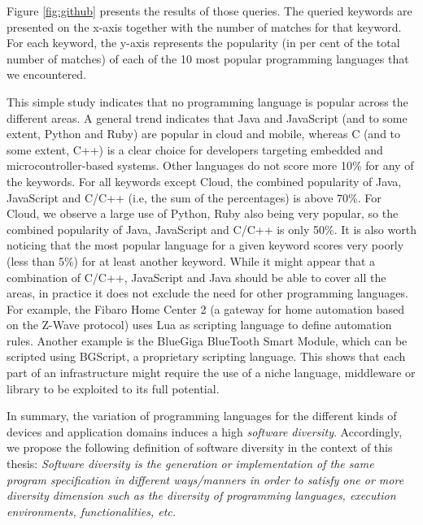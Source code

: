 Figure \ref{fig:github} presents the results of those queries. The queried keywords are presented on the x-axis together with the number of matches for that keyword. For each keyword, the y-axis represents the popularity (in per cent of the total number of matches) of each of the 10 most popular programming languages that we encountered.


This simple study indicates that no programming language is popular across the different areas. A general trend indicates that Java and JavaScript (and to some extent, Python and Ruby) are popular in cloud and mobile, whereas C (and to some extent, C++) is a clear choice for developers targeting embedded and microcontroller-based systems. Other languages do not score more 10\% for any of the keywords. 
For all keywords except Cloud, the combined popularity of Java, JavaScript and C/C++ (i.e, the sum
of the percentages) is above 70\%. For Cloud, we observe a large use of Python, Ruby also being very popular, so the combined popularity of Java, JavaScript and C/C++ is only 50\%. It is also worth noticing that the most popular language for a given keyword scores very poorly (less than 5\%) for at least another keyword. While it might appear that a combination of C/C++, JavaScript and Java should be able to cover all the areas, in practice it does not exclude the need for other programming languages. For example, the Fibaro Home Center 2 (a gateway for home automation based on the Z-Wave protocol) uses Lua as scripting language to define automation rules. Another example is the BlueGiga BlueTooth Smart Module, which can be scripted using BGScript, a proprietary scripting language. This shows that each part of an infrastructure might require the use of a niche language, middleware or library to be exploited to its full potential.


In summary, the variation of programming languages for the different kinds of devices and application domains induces a high \textit{software diversity}. Accordingly, we propose the following definition of software diversity in the context of this thesis: 
\textit{Software diversity is the generation or implementation of the same program specification in different ways/manners in order to satisfy one or more diversity dimension such as the diversity of programming languages, execution environments, functionalities, etc. }
		

